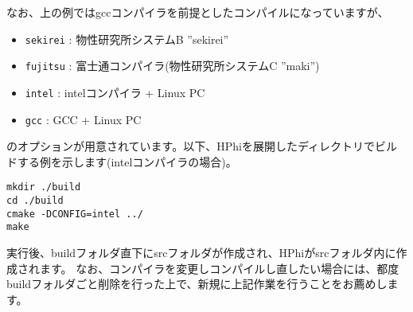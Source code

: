 なお、上の例ではgccコンパイラを前提としたコンパイルになっていますが、
\begin{itemize}
\item \verb|sekirei| : 物性研究所システムB ''sekirei''
\item \verb|fujitsu| : 富士通コンパイラ(物性研究所システムC ''maki'')
\item \verb|intel| : intelコンパイラ + Linux PC
\item \verb|gcc| : GCC + Linux PC
\end{itemize}
のオプションが用意されています。以下、HPhiを展開したディレクトリでビルドする例を示します(intelコンパイラの場合)。
\begin{verbatim}
mkdir ./build
cd ./build
cmake -DCONFIG=intel ../
make
\end{verbatim}
実行後、buildフォルダ直下にsrcフォルダが作成され、HPhiがsrcフォルダ内に作成されます。
なお、コンパイラを変更しコンパイルし直したい場合には、都度buildフォルダごと削除を行った上で、新規に上記作業を行うことをお薦めします。


\label{Sec:HowToInstall}
